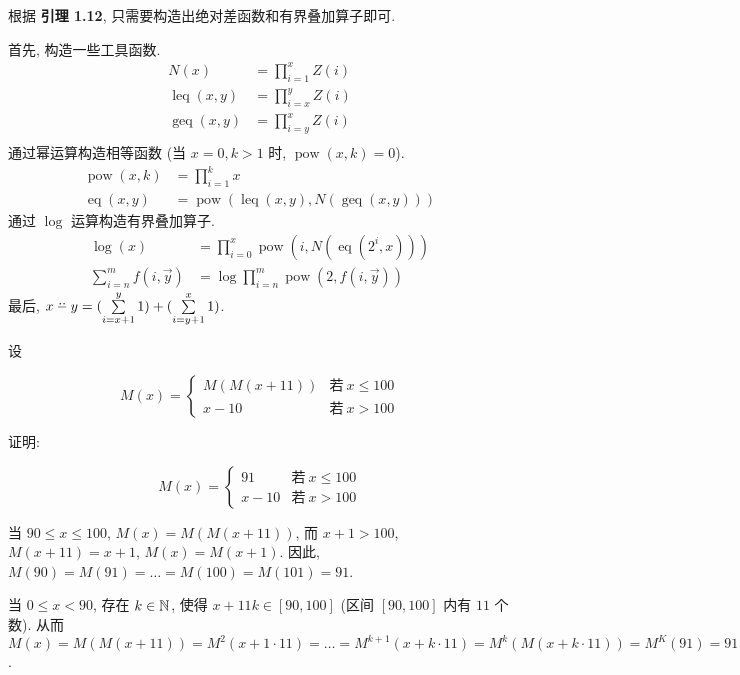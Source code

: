 \begin{solution}
根据 \textbf{引理 1.12}, 只需要构造出绝对差函数和有界叠加算子即可.

首先, 构造一些工具函数.
\begin{align*}
N(x) & = \prod_{i=1}^x Z(i) \\
\operatorname{leq}(x, y) & = \prod_{i=x}^y Z(i) \\
\operatorname{geq}(x, y) & = \prod_{i=y}^x Z(i) \\
\end{align*}
通过幂运算构造相等函数 (当 $x = 0, k > 1$ 时, $\operatorname{pow}(x, k) = 0$).
\begin{align*}
\operatorname{pow}(x, k) & = \prod_{i = 1}^k x \\
\operatorname{eq}(x, y) & = \operatorname{pow}(\operatorname{leq}(x, y), N(\operatorname{geq}(x, y)))
\end{align*}
通过 $\log$ 运算构造有界叠加算子.
\begin{align*}
\log(x) & = \prod_{i = 0}^x \operatorname{pow}(i, N(\operatorname{eq}(2^i, x))) \\
\sum_{i = n}^m f(i, \vec{y}) & = \log \prod_{i = n}^m \operatorname{pow}(2, f(i, \vec{y}))
\end{align*}
最后, $x \dotdotminus y = (\sum\limits_{i = x + 1}^y 1) + (\sum\limits_{i = y + 1}^x 1)$.
\end{solution}

\begin{problem}
设

\[
M(x) = \begin{cases}
M(M(x + 11)) & \text{若} ~ x \le 100 \\
x - 10 & \text{若} ~ x > 100
\end{cases}
\]

证明:

\[
M(x) = \begin{cases}
91 & \text{若} ~ x \le 100 \\
x - 10 & \text{若} ~ x > 100
\end{cases}
\]
\end{problem}

\begin{solution}
当 $90 \le x \le 100$, $M(x) = M(M(x + 11))$, 而 $x + 1 > 100$, $M(x + 11) = x + 1$, $M(x) = M(x + 1)$. 因此, $M(90) = M(91) = \dots = M(100) = M(101) = 91$.


当 $0 \le x < 90$, 存在 $k \in \mathbb{N}^{}$, 使得 $x + 11k \in [90, 100]$ (区间 $[90, 100]$ 内有 $11$ 个数). 从而 $M(x) = M(M(x + 11)) = M^2(x + 1 \cdot 11) = \dots = M^{k+1}(x + k \cdot 11) = M^k(M(x + k \cdot 11)) = M^K(91) = 91$.
\end{solution}

